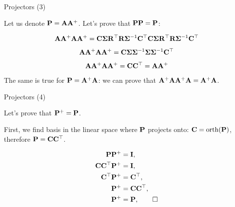 \documentclass{beamer}
\begin{document}
\begin{frame}{Projectors (3)}
	\begin{flushleft}
		
		Let us denote $\mathbf{P} = \mathbf{A}\mathbf{A}^+$. 
		Let's prove that $\mathbf{P}\mathbf{P} = \mathbf{P}$:
		
		\begin{equation}
			\mathbf{A} \mathbf{A}^+ \mathbf{A} \mathbf{A}^+ = 
			\mathbf{C} \mathbf{\Sigma} \mathbf{R}^\top 
			\mathbf{R} \mathbf{\Sigma}^{-1} \mathbf{C}^\top 
			\mathbf{C} \mathbf{\Sigma} \mathbf{R}^\top 
			\mathbf{R} \mathbf{\Sigma}^{-1} \mathbf{C}^\top
		\end{equation}
		
		\begin{equation}
			\mathbf{A} \mathbf{A}^+ \mathbf{A} \mathbf{A}^+ = 
			\mathbf{C} \mathbf{\Sigma} \mathbf{\Sigma}^{-1}\mathbf{\Sigma} \mathbf{\Sigma}^{-1} \mathbf{C}^\top
		\end{equation}	
		
		\begin{equation}
			\mathbf{A} \mathbf{A}^+ \mathbf{A} \mathbf{A}^+ = 
			\mathbf{C} \mathbf{C}^\top =
			\mathbf{A} \mathbf{A}^+
		\end{equation}		
		
		The same is true for $\mathbf{P} = \mathbf{A}^+\mathbf{A}$: we can prove that $\mathbf{A}^+\mathbf{A} \mathbf{A}^+\mathbf{A} = \mathbf{A}^+\mathbf{A}$.
		
	\end{flushleft}
\end{frame}





\begin{frame}{Projectors (4)}
	\begin{flushleft}
		
		Let's prove that $\mathbf{P}^+ = \mathbf{P}$. 
		
		First, we find basis in the linear space where $\mathbf{P}$ projects onto: $\mathbf{C} = \text{orth}(\mathbf{P})$, therefore $\mathbf{P} = \mathbf{C}\mathbf{C}^\top$.
		
		\begin{align}
			\mathbf{P}\mathbf{P}^+ &= \mathbf{I}, \\
			\mathbf{C}\mathbf{C}^\top\mathbf{P}^+ &= \mathbf{I}, \\
			\mathbf{C}^\top \mathbf{P}^+ &= \mathbf{C}^\top, \\
			\mathbf{P}^+ &= \mathbf{C} \mathbf{C}^\top, \\
			\mathbf{P}^+ &= \mathbf{P}, \qed
		\end{align}
		
		
	\end{flushleft}
\end{frame}
\end{document}
